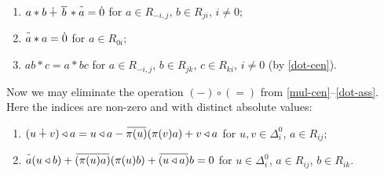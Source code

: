 \documentclass{article}
\theoremstyle{definition}
\newcommand{\inv}[1]{
    \!\;\overline{
        \!\!\:#1\vphantom !\!\!\:
    }\;\!
}
\begin{document}
\begin{enumerate}[label = {(Z\arabic*)}]
    \item \label{str-inv-2} \(
        a * b \dotplus \inv{\,b\,} * \inv a = \dot 0
    \) for \(a \in R_{-i, j}\), \(b \in R_{ji}\), \(i \neq 0\);

    \item \label{str-inv-sq} \(
        \inv a * a = \dot 0
    \) for \(a \in R_{0i}\);

    \item \label{str-ass-2} \(
        ab * c = a * bc
    \) for \(a \in R_{-i, j}\), \(b \in R_{jk}\), \(c \in R_{ki}\), \(i \neq 0\) (by \ref{dot-cen}).

\end{enumerate}

Now we may eliminate the operation \(({-}) \circ ({=})\) from \ref{mul-cen}--\ref{dot-ass}. Here the indices are non-zero and with distinct absolute values:

\begin{enumerate}[label = {(Z\arabic*)}, start = 13]

    \item \label{tri-dis-l-2} \(
        (u \dotplus v) \triangleleft a
        =
        u \triangleleft a
        - \inv{ \pi(u) } (\pi(v) a)
        + v \triangleleft a
    \) for \(u, v \in \Delta^0_i\), \(a \in R_{ij}\);

    \item \label{inv-tri-2} \(
        \inv a (u \triangleleft b)
        + \inv{ (\pi(u) a) } (\pi(u) b)
        + \inv{(u \triangleleft a)} b
        = 0
    \) for \(u \in \Delta^0_i\), \(a \in R_{ij}\), \(b \in R_{ik}\).

\end{enumerate}
\end{document}
